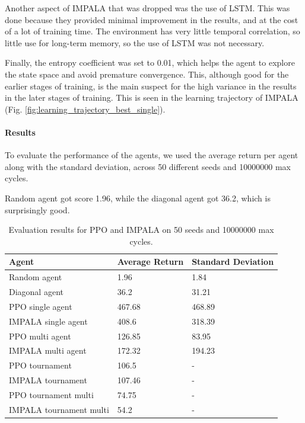 \documentclass[12pt,a4paper, onecolumn]{exam}
\begin{document}
Another aspect of IMPALA that was dropped was the use of LSTM. This was done because they provided minimal improvement in the results, and
at the cost of a lot of training time. The environment has very little temporal correlation, so little use for long-term memory, so the use of LSTM was not necessary.

Finally, the entropy coefficient was set to 0.01, which helps the agent to explore the state space and avoid premature convergence.
This, although good for the earlier stages of training, is the main suspect for the high variance in the results in the later stages of training.
This is seen in the learning trajectory of IMPALA (Fig. \ref{fig:learning_trajectory_best_single}).

\paragraph{Results}

To evaluate the performance of the agents, we used the average return per agent along with the standard deviation, across 50 different seeds and 10000000 max cycles.

Random agent got score  1.96, while the diagonal agent got 36.2, which is surprisingly good.

\begin{table}[h]
    \centering
    \begin{tabular}{|l|l|l|}
        \hline
        \textbf{Agent}          & \textbf{Average Return} & \textbf{Standard Deviation} \\
        \hline
        Random agent            & 1.96                    & 1.84                        \\
        Diagonal agent          & 36.2                    & 31.21                       \\
        \hline
        PPO single agent        & 467.68                  & 468.89                      \\
        IMPALA single agent     & 408.6                   & 318.39                      \\
        \hline
        PPO multi agent         & 126.85                  & 83.95                       \\
        IMPALA multi agent      & 172.32                  & 194.23                      \\
        \hline
        PPO tournament          & 106.5                   & -                           \\
        IMPALA tournament       & 107.46                  & -                           \\
        \hline
        PPO tournament multi    & 74.75                   & -                           \\
        IMPALA tournament multi & 54.2                    & -                           \\
        \hline
    \end{tabular}
    \caption{Evaluation results for PPO and IMPALA on 50 seeds and 10000000 max cycles.}
    \label{tab:results}
\end{table}
\end{document}
